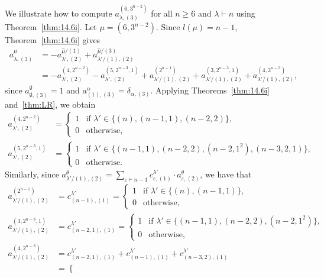 \documentclass[ALCO, Unicode]{cedram}
\begin{document}
\begin{example}\label{ex:14.7}
	We illustrate how to compute $a^{(6,3^{n-2})}_{\lambda,(3)}$ for all $n\ge 6$ and $\lambda\vdash n$ using Theorem~\ref{thm:14.6i}. 
	Let $\mu=(6,3^{n-2})$. Since $l(\mu)=n-1$, Theorem~\ref{thm:14.6i} gives
	\begin{align*} a^\mu_{\lambda,(3)}& = - a^{\hat{\mu}/(1)}_{\lambda',(2)} + a^{\hat{\mu}/(3)}_{\lambda'/(1),(2)} \\&= -a^{(4,2^{n-2})}_{\lambda',(2)} - a^{(5,2^{n-3},1)}_{\lambda',(2)} + a^{(2^{n-1})}_{\lambda'/(1),(2)} + a^{(3,2^{n-3},1)}_{\lambda'/(1),(2)} + a^{(4,2^{n-3})}_{\lambda'/(1),(2)}, \end{align*}
	since $a^\emptyset_{\emptyset,(3)}=1$ and $a^\alpha_{(1),(3)}=\delta_{\alpha,(3)}$. Applying Theorems~\ref{thm:14.6i} and~\ref{thm:LR}, we obtain
	\begin{align*}
		a^{(4,2^{n-2})}_{\lambda',(2)} &= \begin{cases} 1 & \text{if }\lambda'\in\{(n),(n-1,1),(n-2,2)\},\\ 0&\text{otherwise},\end{cases}\\
		a^{(5,2^{n-3},1)}_{\lambda',(2)} &= \begin{cases} 1 & \text{if }\lambda'\in\{(n-1,1),(n-2,2),(n-2,1^2),(n-3,2,1)\},\\ 0&\text{otherwise}.\end{cases}
	\end{align*}
	Similarly, since $a^\theta_{\lambda'/(1),(2)} = \sum_{\varepsilon\vdash n-1}c^{\lambda'}_{\varepsilon,(1)}\cdot a^\theta_{\varepsilon,(2)}$, we have that
	\begin{align*}
		a^{(2^{n-1})}_{\lambda'/(1),(2)} &= c^{\lambda'}_{(n-1),(1)} = \begin{cases}
			1 & \text{if }\lambda'\in\{(n),(n-1,1)\},\\ 0&\text{otherwise},\end{cases}\\
		a^{(3,2^{n-3},1)}_{\lambda'/(1),(2)} &= c^{\lambda'}_{(n-2,1),(1)} = \begin{cases}
			1 & \text{if }\lambda'\in\{(n-1,1),(n-2,2),(n-2,1^2)\},\\ 0&\text{otherwise},\end{cases}\\
		a^{(4,2^{n-3})}_{\lambda'/(1),(2)} &= c^{\lambda'}_{(n-2,1),(1)} + c^{\lambda'}_{(n-1),(1)} + c^{\lambda'}_{(n-3,2),(1)}\\
		&= \begin{cases}

\end{cases}
\end{align*}
\end{example}
\end{document}
